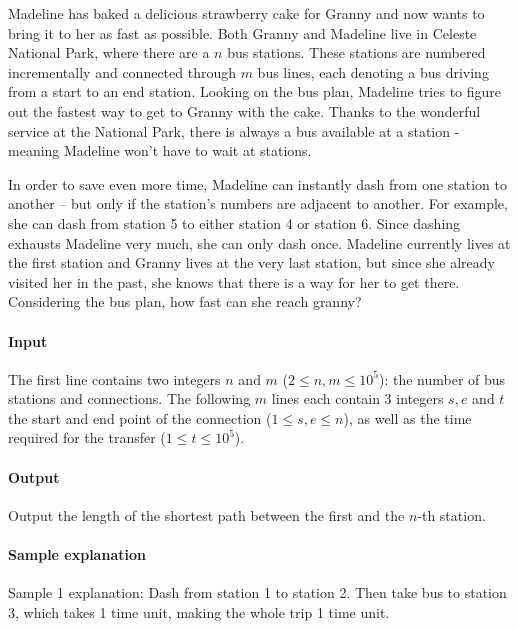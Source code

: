 



\makeheader

Madeline has baked a delicious strawberry cake for Granny and now wants to bring it to her as fast as possible.
Both Granny and Madeline live in Celeste National Park, where there are a $n$ bus stations.
These stations are numbered incrementally and connected through $m$ bus lines, each denoting a bus driving from a start to an end station.
Looking on the bus plan, Madeline tries to figure out the fastest way to get to Granny with the cake.
Thanks to the wonderful service at the National Park, there is always a bus available at a station - meaning Madeline won't have to wait at stations.


In order to save even more time, Madeline can instantly dash from one station to another -- but only if the station's numbers are adjacent to another.
For example, she can dash from station 5 to either station 4 or station 6.
Since dashing exhausts Madeline very much, she can only dash once.
Madeline currently lives at the first station and Granny lives at the very last station, but since she already visited her in the past, she knows that there is a way for her to get there.
Considering the bus plan, how fast can she reach granny?

\paragraph*{Input}

The first line contains two integers $n$ and $m$ ($2 \leq n,m \leq 10^5$): the number of bus stations and connections.
The following $m$ lines each contain 3 integers $s,e$ and $t$ the start and end point of the connection ($1 \leq s,e \leq n$), as well as the time required for the transfer ($1 \leq t \leq 10^5$).

\paragraph*{Output}

Output the length of the shortest path between the first and the $n$-th station.

\begin{samples}
\end{samples}

\paragraph*{Sample explanation}

Sample 1 explanation: Dash from station 1 to station 2. Then take bus to station 3, which takes 1 time unit, making the whole trip 1 time unit.

